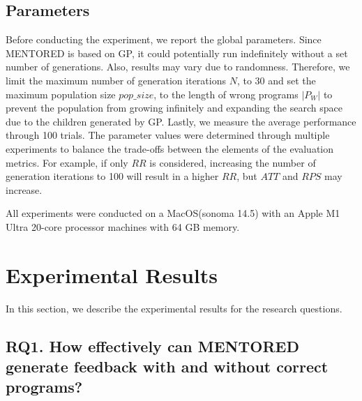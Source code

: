 \documentclass[10pt,conference]{IEEEtran}
\begin{document}
    \subsection{Parameters}
        Before conducting the experiment, we report the global parameters. Since MENTORED is based on GP, it could potentially run indefinitely without a set number of generations. Also, results may vary due to randomness. Therefore, we limit the maximum number of generation iterations $N$, to 30 and set the maximum population size $pop\_size$, to the length of wrong programs $|P_{W}|$ to prevent the population from growing infinitely and expanding the search space due to the children generated by GP. Lastly, we measure the average performance through 100 trials. The parameter values were determined through multiple experiments to balance the trade-offs between the elements of the evaluation metrics. For example, if only $RR$ is considered, increasing the number of generation iterations to 100 will result in a higher $RR$, but $ATT$ and $RPS$ may increase.

    All experiments were conducted on a MacOS(sonoma 14.5) with an Apple M1 Ultra 20-core processor machines with 64 GB memory.



\section{Experimental Results}
    In this section, we describe the experimental results for the research questions.

    \subsection{RQ1. How effectively can MENTORED generate feedback with and without correct programs?}
\end{document}
